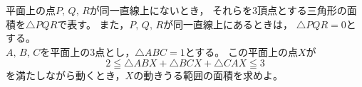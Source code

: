 \documentclass[../../main.tex]{subfiles}
\begin{document}
平面上の点$P, \, Q, \, R$が同一直線上にないとき，
それらを3頂点とする三角形の面積を$\triangle PQR$で表す。
また，$P, \, Q, \, R$が同一直線上にあるときは，
$\triangle PQR=0$とする。\\
$A, \, B, \, C$を平面上の3点とし，$\triangle ABC=1$とする。
この平面上の点$X$が
\[ 2 \leqq \triangle ABX+\triangle BCX+\triangle CAX \leqq 3 \]
を満たしながら動くとき，$X$の動きうる範囲の面積を求めよ。
\end{document}
